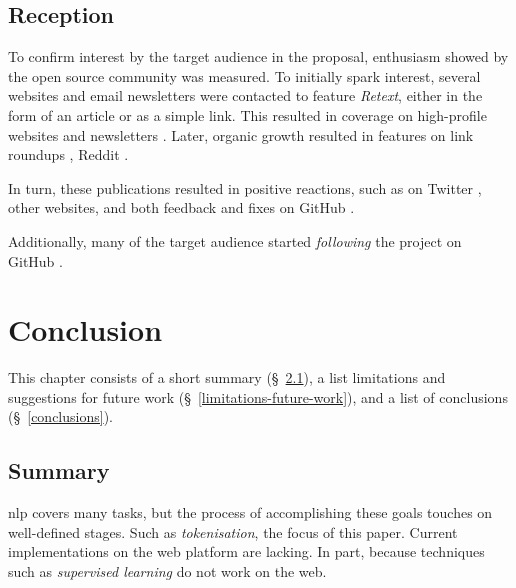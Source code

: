 \section{Reception}\label{reception}

To confirm interest by the target audience in the proposal, enthusiasm
  showed by the open source community was measured.
To initially spark interest, several websites and email newsletters were
  contacted to feature \emph{Retext}, either in the form of an article or as
  a simple link.
This resulted in coverage on high-profile websites
  \autocite{dailyjs.com-natural-language-parsing-retext} and newsletters
  \autocites{nodeweekly.com-47}{javascriptweekly.com-193}
  {newspaper.io/javascript-2014-08-11}.
Later, organic growth resulted in features on link roundups
  \autocites{github.com-awesome-machine-learning}{github.com-awesome-nodejs},
  Reddit \autocites{reddit.com-mention-1}{reddit.com-mention-2}
  {reddit.com-mention-3}.

In turn, these publications resulted in positive reactions, such as on
  Twitter \autocites{twitter.com-mention-1}{twitter.com-mention-2}
  {twitter.com-mention-3}{twitter.com-mention-4}{twitter.com-mention-5}
  {twitter.com-mention-6}, other websites, and both feedback and fixes
  on GitHub \autocites{github.com-issue-1}{github.com-issue-2}
  {github.com-issue-3}{github.com-pull-request}.

Additionally, many of the target audience started \emph{following} the
  project on GitHub \autocite{github.com-stargazers}.

\chapter{Conclusion}\label{conclusion}

This chapter consists of a short summary (§~\ref{summary}), a list
  limitations and suggestions for future work
  (§~\ref{limitations-future-work}), and a list of conclusions
  (§~\ref{conclusions}).

\section{Summary}\label{summary}

\gls{nlp} covers many tasks, but the process of accomplishing
  these goals touches on well-defined stages.
Such as \emph{tokenisation}, the focus of this paper.
Current implementations on the web platform are lacking.
In part, because techniques such as \emph{supervised learning} do not work
  on the web.

